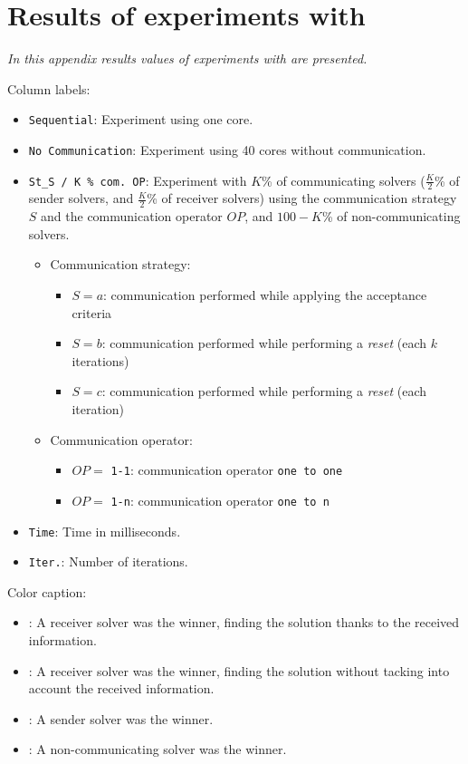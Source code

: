 \chapter{Results of experiments with \carrp}
\label{app:cap}
\textit{In this appendix results values of experiments with \carrp{} are presented.}
\vfill
\newpage

Column labels:
\begin{itemize}
\item \texttt{Sequential}: Experiment using one core.
\item \texttt{No Communication}: Experiment using 40 cores without communication.
\item \texttt{St\_S / K \% com. OP}: Experiment with $K$\% of communicating solvers ($\tfrac{K}{2}$\% of sender solvers, and $\tfrac{K}{2}$\% of receiver solvers) using the communication strategy $S$ and the communication operator $OP$, and $100-K$\% of non-communicating solvers.
\begin{itemize}
\item Communication strategy:
	\begin{itemize}
	\item $S = a$: communication performed while applying the acceptance criteria 
	\item $S = b$: communication performed while performing a {\it reset} (each $k$ iterations)
	\item $S = c$: communication performed while performing a {\it reset} (each iteration)
	\end{itemize}
\item Communication operator:
	\begin{itemize}
	\item $OP = $ \texttt{1-1}: communication operator \texttt{one~to~one}
	\item $OP = $ \texttt{1-n}: communication operator \texttt{one~to~n}
	\end{itemize}
\end{itemize}
\item \texttt{Time}: Time in milliseconds. 
\item \texttt{Iter.}: Number of iterations.
\end{itemize}

Color caption:
\begin{itemize}
\item {}: A receiver solver was the winner, finding the solution thanks to the received information.
\item {}: A receiver solver was the winner, finding the solution without tacking into account the received information.
\item {}: A sender solver was the winner.
\item {}: A non-communicating solver was the winner.
\end{itemize}


\clearpage
